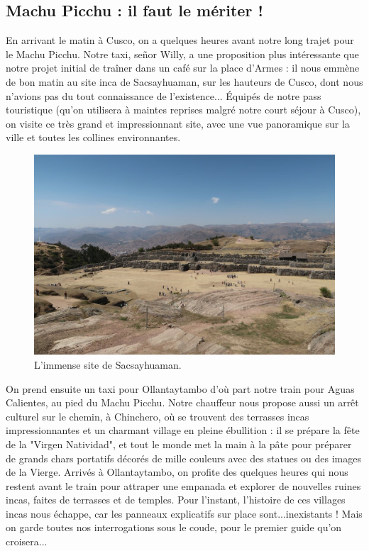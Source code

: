 \hypertarget{machu-picchu-il-faut-le-muxe9riter}{%
\subsection{Machu Picchu : il faut le mériter
!}\label{machu-picchu-il-faut-le-muxe9riter}}

En arrivant le matin à Cusco, on a quelques heures avant notre long
trajet pour le Machu Picchu. Notre taxi, señor Willy, a une proposition
plus intéressante que notre projet initial de traîner dans un café sur
la place d'Armes : il nous emmène de bon matin au site inca de
Sacsayhuaman, sur les hauteurs de Cusco, dont nous n'avions pas du tout
connaissance de l'existence... Équipés de notre pass touristique (qu'on
utilisera à maintes reprises malgré notre court séjour à Cusco), on
visite ce très grand et impressionnant site, avec une vue panoramique
sur la ville et toutes les collines environnantes.

\begin{figure}
\centering
\includegraphics{images/20180911_cusco_sacsaywoman.JPG}
\caption{L'immense site de Sacsayhuaman.}
\end{figure}

On prend ensuite un taxi pour Ollantaytambo d'où part notre train pour
Aguas Calientes, au pied du Machu Picchu. Notre chauffeur nous propose
aussi un arrêt culturel sur le chemin, à Chinchero, où se trouvent des
terrasses incas impressionnantes et un charmant village en pleine
ébullition : il se prépare la fête de la "Virgen Natividad", et tout le
monde met la main à la pâte pour préparer de grands chars portatifs
décorés de mille couleurs avec des statues ou des images de la Vierge.
Arrivés à Ollantaytambo, on profite des quelques heures qui nous restent
avant le train pour attraper une empanada et explorer de nouvelles
ruines incas, faites de terrasses et de temples. Pour l'instant,
l'histoire de ces villages incas nous échappe, car les panneaux
explicatifs sur place sont...inexistants ! Mais on garde toutes nos
interrogations sous le coude, pour le premier guide qu'on croisera...

